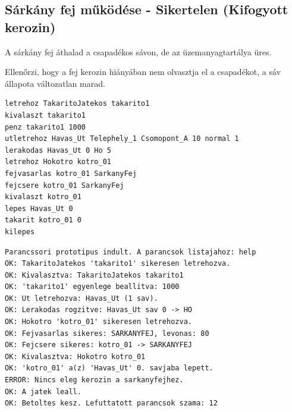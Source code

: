 \subsection{Sárkány fej működése - Sikertelen (Kifogyott kerozin)}
\begin{test-case-description}
    A sárkány fej áthalad a csapadékos sávon, de az üzemanyagtartálya üres.
\end{test-case-description}
\begin{test-case-function}
    Ellenőrzi, hogy a fej kerozin hiányában nem olvasztja el a csapadékot, a sáv állapota változatlan marad.
\end{test-case-function}
\begin{test-case-input}
\begin{verbatim}
letrehoz TakaritoJatekos takarito1
kivalaszt takarito1
penz takarito1 1000
utletrehoz Havas_Ut Telephely_1 Csomopont_A 10 normal 1
lerakodas Havas_Ut 0 Ho 5
letrehoz Hokotro kotro_01
fejvasarlas kotro_01 SarkanyFej
fejcsere kotro_01 SarkanyFej
kivalaszt kotro_01
lepes Havas_Ut 0
takarit kotro_01 0
kilepes
\end{verbatim}
\end{test-case-input}
\begin{test-case-output}
\begin{verbatim}
Parancssori prototipus indult. A parancsok listajahoz: help
OK: TakaritoJatekos 'takarito1' sikeresen letrehozva.
OK: Kivalasztva: TakaritoJatekos takarito1
OK: 'takarito1' egyenlege beallitva: 1000
OK: Ut letrehozva: Havas_Ut (1 sav).
OK: Lerakodas rogzitve: Havas_Ut sav 0 -> HO
OK: Hokotro 'kotro_01' sikeresen letrehozva.
OK: Fejvasarlas sikeres: SARKANYFEJ, levonas: 80
OK: Fejcsere sikeres: kotro_01 -> SARKANYFEJ
OK: Kivalasztva: Hokotro kotro_01
OK: 'kotro_01' a(z) 'Havas_Ut' 0. savjaba lepett.
ERROR: Nincs eleg kerozin a sarkanyfejhez.
OK: A jatek leall.
OK: Betoltes kesz. Lefuttatott parancsok szama: 12
\end{verbatim}
\end{test-case-output}

